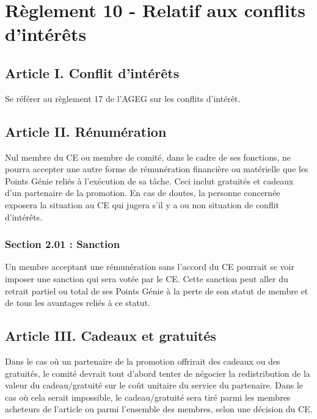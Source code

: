 \section*{Règlement 10 - Relatif aux conflits d'intérêts} 

\subsection*{Article I. Conflit d'intérêts}
Se référer au règlement 17 de l’AGEG sur les conflits d’intérêt.

\subsection*{Article II. Rénumération}
Nul membre du CE ou membre de comité, dans le cadre de ses fonctions, ne pourra accepter une autre forme de rémunération financière ou matérielle que les Points Génie reliés à l’exécution de sa tâche. Ceci inclut gratuités et cadeaux d’un partenaire de la promotion. En cas de doutes, la personne concernée exposera la situation au CE qui jugera s'il y a ou non situation de conflit d’intérêts.

\subsubsection*{Section 2.01 : Sanction}
Un membre acceptant une rémunération sans l’accord du CE pourrait se voir imposer une sanction qui sera votée par le CE.  Cette sanction peut aller du retrait partiel ou total de ses Points Génie à la perte de son statut de membre et de tous les avantages reliés à ce statut.

\subsection*{Article III. Cadeaux et gratuités}
Dans le cas où un partenaire de la promotion offrirait des cadeaux ou des gratuités, le comité devrait tout d’abord tenter de négocier la redistribution de la valeur du cadeau/gratuité sur le coût unitaire du service du partenaire. Dans le cas où cela serait impossible, le cadeau/gratuité sera tiré parmi les membres acheteurs de l’article ou parmi l’ensemble des membres, selon une décision du CE. 

